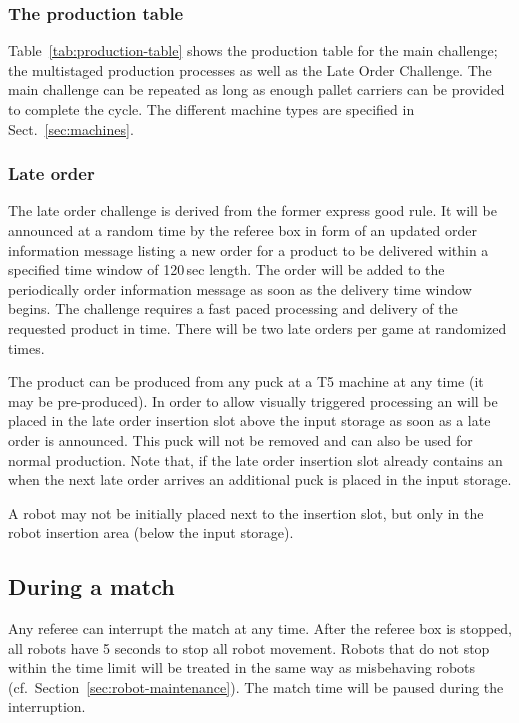 \documentclass[12pt,twoside]{article}
\newcommand{\refsec}[1]{Section~\ref{#1}}
\begin{document}
\subsubsection{The production table}

Table~\ref{tab:production-table} shows the production table for the
main challenge; the multistaged production processes as well as the
Late Order Challenge. The main challenge can be repeated as long as
enough pallet carriers can be provided to complete the cycle. The
different machine types are specified in Sect.~\ref{sec:machines}.



\subsubsection{Late order}
\label{sec:late-order}
The late order challenge is derived from the former express good
rule. It will be announced at a random time by the referee box in form
of an updated order information message listing a new order for a 
product to be delivered within a specified time window of 120\,sec
length. The order will be added to the periodically order information
message as soon as the delivery time window begins. The challenge
requires a fast paced processing and delivery of the requested product
in time. There will be two late orders per game at randomized
times.

The  product can be produced from any  puck at a T5 machine at
any time (it may be pre-produced). In order to allow visually
triggered processing an  will be placed in the late order insertion
slot above the input storage as soon as a late order is announced.
This  puck will not be removed and can also be used for normal
production. Note that, if the late order insertion slot already
contains an  when the next late order arrives an additional 
puck is placed in the input storage.

A robot may not be initially placed next to the insertion slot, but
only in the robot insertion area (below the input storage).

\subsection{During a match}
\label{sec:during-match}
Any referee can interrupt the match at any time. After the referee box
is stopped, all robots have 5 seconds to stop all robot movement.
Robots that do not stop within the time limit will be treated in the
same way as misbehaving robots (cf.~\refsec{sec:robot-maintenance}).
The match time will be paused during the interruption.
\end{document}
